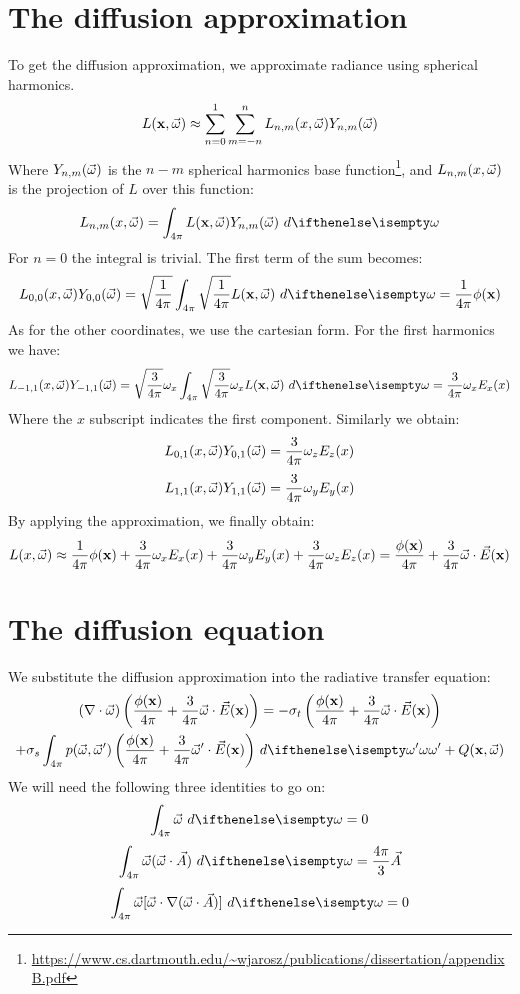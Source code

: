 \documentclass[10pt,a4paper]{article}
\begin{document}
\section{The diffusion approximation}
To get the diffusion approximation, we approximate radiance using spherical harmonics.
$$
{L}(\mathbf{x}, \vec{\omega}) \approx \sum_{n = 0}^{1} \sum_{m = -n}^{n} L_{n,m}(x, \vec{\omega}) Y_{n,m}(\vec{\omega})
$$
Where $ Y_{n,m}(\vec{\omega})$ is the $n-m$ spherical harmonics base function\footnote{\url{https://www.cs.dartmouth.edu/~wjarosz/publications/dissertation/appendixB.pdf}}, and $L_{n,m}(x, \vec{\omega})$ is the projection of $L$ over this function:
$$
L_{n,m}(x, \omegavec) = \sphere{\xomegafunc{L} Y_{n,m}(\omegavec)}{}
$$
For $n = 0$ the integral is trivial.  The first term of the sum becomes:
$$
L_{0,0}(x, \omegavec) Y_{0,0}(\omegavec) = \sqrt{\frac{1}{4\pi}} \sphere{\sqrt{\frac{1}{4\pi}} \xomegafunc{L}}{} = \frac{1}{4\pi} \xfunc{\phi}
$$
As for the other coordinates, we use the cartesian form. For the first harmonics we have:
$$
L_{-1,1}(x, \omegavec) Y_{-1,1}(\omegavec) = \sqrt{\frac{3}{4\pi}} \omega_x \sphere{\sqrt{\frac{3}{4\pi}} \omega_x \xomegafunc{L}}{} = \frac{3}{4\pi} \omega_x {E}_x(x)
$$
Where the $x$ subscript indicates the first component. Similarly we obtain:
$$
L_{0,1}(x, \vec{\omega}) Y_{0,1}(\vec{\omega}) = \frac{3}{4\pi} \omega_z {E}_z(x)
$$
$$
L_{1,1}(x, \vec{\omega}) Y_{1,1}(\vec{\omega}) = \frac{3}{4\pi} \omega_y {E}_y(x)
$$
By applying the approximation, we finally obtain:
$$
L(x, \vec{\omega}) \approx \frac{1}{4\pi} {\phi}(\mathbf{x}) + \frac{3}{4\pi} \omega_x {E}_x(x) + \frac{3}{4\pi} \omega_y {E}_y(x)+ \frac{3}{4\pi} \omega_z {E}_z(x) = \frac{{\phi}(\mathbf{x})}{4\pi} + \frac{3}{4\pi} \vec{\omega} \cdot \vec{E}(\mathbf{x})
$$
\section{The diffusion equation}
We substitute the diffusion approximation into the radiative transfer equation:
\begin{multline*}
(\nablavec \cdot \omegavec) \left(\frac{\xfunc{\phi}}{4\pi} + \frac{3}{4\pi} \omegavec \cdot \xvecfunc{E}\right)
= -\extinction\left(\frac{\xfunc{\phi}}{4\pi} + \frac{3}{4\pi} \omegavec \cdot \xvecfunc{E}\right)
 \\+ \scattering \sphere {p(\omegavec, \omegavec') \left(\frac{\xfunc{\phi}}{4\pi} + \frac{3}{4\pi} \omegavec' \cdot\xvecfunc{E}\right)}{\omega'}
 + \xomegafunc{Q}
\end{multline*}
We will need the following three identities to go on:
$$
\sphere{\omegavec}{} = 0 
$$
\begin{equation}
\sphere{\omegavec (\omegavec \cdot \vec{A}) }{} = \frac{4 \pi}{3} \vec{A} 
\label{eq:id1}
\end{equation}
$$
\sphere{\omegavec [ \omegavec \cdot \nablavec(\omegavec \cdot \vec{A})]}{} = 0 
$$
\end{document}
